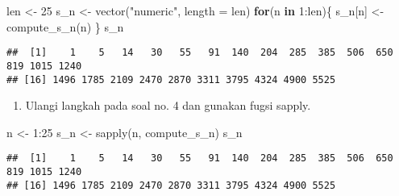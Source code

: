 \documentclass[
]{article}
\newenvironment{Shaded}{\begin{snugshade}}{\end{snugshade}}
\newcommand{\AttributeTok}[1]{\textcolor[rgb]{0.77,0.63,0.00}{#1}}
\newcommand{\ControlFlowTok}[1]{\textcolor[rgb]{0.13,0.29,0.53}{\textbf{#1}}}
\newcommand{\DecValTok}[1]{\textcolor[rgb]{0.00,0.00,0.81}{#1}}
\newcommand{\FunctionTok}[1]{\textcolor[rgb]{0.00,0.00,0.00}{#1}}
\newcommand{\NormalTok}[1]{#1}
\newcommand{\OtherTok}[1]{\textcolor[rgb]{0.56,0.35,0.01}{#1}}
\newcommand{\SpecialCharTok}[1]{\textcolor[rgb]{0.00,0.00,0.00}{#1}}
\newcommand{\StringTok}[1]{\textcolor[rgb]{0.31,0.60,0.02}{#1}}
\providecommand{\tightlist}{%
  \setlength{\itemsep}{0pt}\setlength{\parskip}{0pt}}
\begin{document}
\begin{Shaded}
\begin{Highlighting}[]
\NormalTok{len }\OtherTok{\textless{}{-}} \DecValTok{25} 
\NormalTok{s\_n }\OtherTok{\textless{}{-}} \FunctionTok{vector}\NormalTok{(}\StringTok{"numeric"}\NormalTok{, }\AttributeTok{length =}\NormalTok{ len)}
\ControlFlowTok{for}\NormalTok{(n }\ControlFlowTok{in} \DecValTok{1}\SpecialCharTok{:}\NormalTok{len)\{ }
\NormalTok{s\_n[n] }\OtherTok{\textless{}{-}} \FunctionTok{compute\_s\_n}\NormalTok{(n) }
\NormalTok{\} }
\NormalTok{s\_n}
\end{Highlighting}
\end{Shaded}

\begin{verbatim}
##  [1]    1    5   14   30   55   91  140  204  285  385  506  650  819 1015 1240
## [16] 1496 1785 2109 2470 2870 3311 3795 4324 4900 5525
\end{verbatim}

\begin{enumerate}
\def\labelenumi{\arabic{enumi}.}
\setcounter{enumi}{4}
\tightlist
\item
  Ulangi langkah pada soal no. 4 dan gunakan fugsi sapply.
\end{enumerate}

\begin{Shaded}
\begin{Highlighting}[]
\NormalTok{n }\OtherTok{\textless{}{-}} \DecValTok{1}\SpecialCharTok{:}\DecValTok{25} 
\NormalTok{s\_n }\OtherTok{\textless{}{-}} \FunctionTok{sapply}\NormalTok{(n, compute\_s\_n) }
\NormalTok{s\_n}
\end{Highlighting}
\end{Shaded}

\begin{verbatim}
##  [1]    1    5   14   30   55   91  140  204  285  385  506  650  819 1015 1240
## [16] 1496 1785 2109 2470 2870 3311 3795 4324 4900 5525
\end{verbatim}
\end{document}

